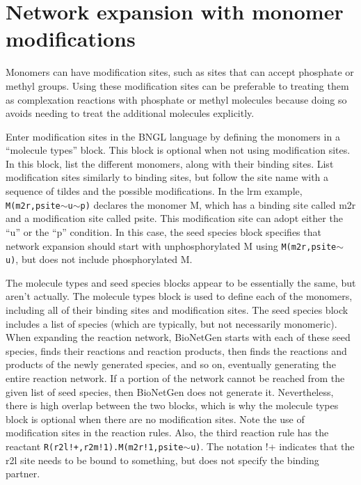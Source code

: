 \documentclass {book}
\newcommand {\ttt} {\texttt}
\begin{document}
\section{Network expansion with monomer modifications}

Monomers can have modification sites, such as sites that can accept phosphate or methyl groups. Using these modification sites can be preferable to treating them as complexation reactions with phosphate or methyl molecules because doing so avoids needing to treat the additional molecules explicitly.

Enter modification sites in the BNGL language by defining the monomers in a ``molecule types'' block. This block is optional when not using modification sites. In this block, list the different monomers, along with their binding sites. List modification sites similarly to binding sites, but follow the site name with a sequence of tildes and the possible modifications. In the lrm example, \ttt{M(m2r,psite$\sim$u$\sim$p)} declares the monomer M, which has a binding site called m2r and a modification site called psite. This modification site can adopt either the ``u'' or the ``p'' condition. In this case, the seed species block specifies that network expansion should start with unphosphorylated M using \ttt{M(m2r,psite$\sim$u)}, but does not include phosphorylated M.

The molecule types and seed species blocks appear to be essentially the same, but aren't actually. The molecule types block is used to define each of the monomers, including all of their binding sites and modification sites. The seed species block includes a list of species (which are typically, but not necessarily monomeric). When expanding the reaction network, BioNetGen starts with each of these seed species, finds their reactions and reaction products, then finds the reactions and products of the newly generated species, and so on, eventually generating the entire reaction network. If a portion of the network cannot be reached from the given list of seed species, then BioNetGen does not generate it. Nevertheless, there is high overlap between the two blocks, which is why the molecule types block is optional when there are no modification sites.
Note the use of modification sites in the reaction rules. Also, the third reaction rule has the reactant \ttt{R(r2l!+,r2m!1).M(m2r!1,psite$\sim$u)}. The notation !+ indicates that the r2l site needs to be bound to something, but does not specify the binding partner.
\end{document}
